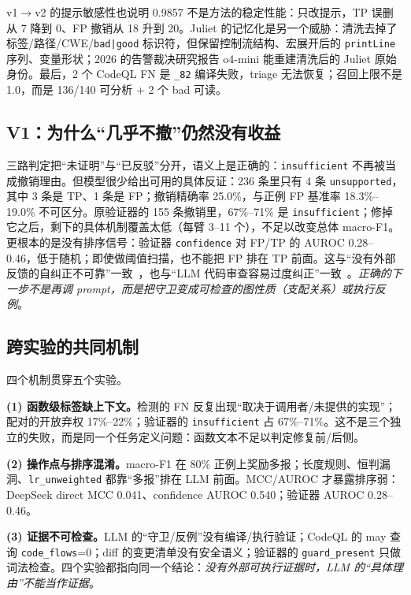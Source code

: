 \documentclass[conference]{IEEEtran}
\begin{document}
v1$\to$v2 的提示敏感性也说明 0.9857 不是方法的稳定性能：只改提示，TP 误删从 7 降到 0、FP 撤销从 18 升到 20。Juliet 的记忆化是另一个威胁：清洗去掉了标签/路径/CWE/\texttt{bad|good} 标识符，但保留控制流结构、宏展开后的 \texttt{printLine} 序列、变量形状；2026 的告警裁决研究报告 o4-mini 能重建清洗后的 Juliet 原始身份。最后，2 个 CodeQL FN 是 \texttt{\_82} 编译失败，triage 无法恢复；召回上限不是 1.0，而是 136/140 可分析 + 2 个 bad 可读。

\subsection{V1：为什么“几乎不撤”仍然没有收益}

三路判定把“未证明”与“已反驳”分开，语义上是正确的：\texttt{insufficient} 不再被当成撤销理由。但模型很少给出可用的具体反证：236 条里只有 4 条 \texttt{unsupported}，其中 3 条是 TP、1 条是 FP；撤销精确率 25.0\%，与正例 FP 基准率 18.3\%--19.0\% 不可区分。原验证器的 155 条撤销里，67\%--71\% 是 \texttt{insufficient}；修掉它之后，剩下的具体机制覆盖太低（每臂 3--11 个），不足以改变总体 macro-F1。更根本的是没有排序信号：验证器 \texttt{confidence} 对 FP/TP 的 AUROC 0.28--0.46，低于随机；即使做阈值扫描，也不能把 FP 排在 TP 前面。这与“没有外部反馈的自纠正不可靠”一致~\cite{huang2024selfcorrect}，也与“LLM 代码审查容易过度纠正”一致~\cite{jin2026overcorrection}。\emph{正确的下一步不是再调 prompt，而是把守卫变成可检查的图性质（支配关系）或执行反例}。

\subsection{跨实验的共同机制}

四个机制贯穿五个实验。

\textbf{(1) 函数级标签缺上下文。}检测的 FN 反复出现“取决于调用者/未提供的实现”；配对的开放弃权 17\%--22\%；验证器的 \texttt{insufficient} 占 67\%--71\%。这不是三个独立的失败，而是同一个任务定义问题：函数文本不足以判定修复前/后侧。

\textbf{(2) 操作点与排序混淆。}macro-F1 在 80\% 正例上奖励多报；长度规则、恒判漏洞、\texttt{lr\_unweighted} 都靠“多报”排在 LLM 前面。MCC/AUROC 才暴露排序弱：DeepSeek direct MCC 0.041、confidence AUROC 0.540；验证器 AUROC 0.28--0.46。

\textbf{(3) 证据不可检查。}LLM 的“守卫/反例”没有编译/执行验证；CodeQL 的 may 查询 \texttt{code\_flows}=0；diff 的变更清单没有安全语义；验证器的 \texttt{guard\_present} 只做词法检查。四个实验都指向同一个结论：\emph{没有外部可执行证据时，LLM 的“具体理由”不能当作证据}。
\end{document}
